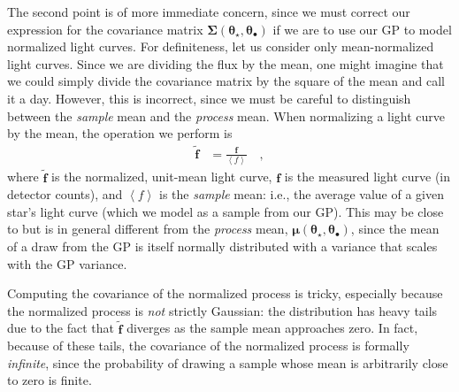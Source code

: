 \documentclass[modern]{aastex62}
\begin{document}
The second point is of more immediate concern, since we must correct our
expression for the covariance matrix
$\pmb{\Sigma}(\pmb{\theta}_\star, \pmb{\theta}_\bullet)$ if we are to
use our GP to model normalized light curves. For definiteness, let us
consider only mean-normalized light curves.
Since we are dividing the
flux by the mean, one might imagine that we could simply divide the
covariance matrix by the square of the mean and call it a day. However,
this is incorrect, since we must be careful to distinguish between the
\emph{sample} mean and the \emph{process} mean. When normalizing a light
curve by the mean, the operation we perform is
%
\begin{align}
    \tilde{\mathbf{f}} & = \frac{\mathbf{f}}{\left<f\right>}
    \quad,
\end{align}
%
where $\tilde{\mathbf{f}}$ is the normalized, unit-mean light curve,
$\mathbf{f}$ is the measured light curve (in detector counts), and
$\left<f\right>$ is the \emph{sample} mean: i.e., the average value of
a given star's light curve (which we model as a sample from our GP).
This may be close to but is in general different from the \emph{process} mean,
$\pmb{\mu}(\pmb{\theta}_\star, \pmb{\theta}_\bullet)$, since the mean of
a draw from the GP is itself normally distributed with a variance that scales
with the GP variance.

Computing the covariance of the normalized process is tricky, especially
because the normalized process is \emph{not} strictly Gaussian: the distribution
has heavy tails due to the fact that $\tilde{\mathbf{f}}$ diverges as
the sample mean approaches zero. In fact, because of these tails, the covariance
of the normalized process is formally \emph{infinite}, since the probability of
drawing a sample whose mean is arbitrarily close to zero is finite.
\end{document}
